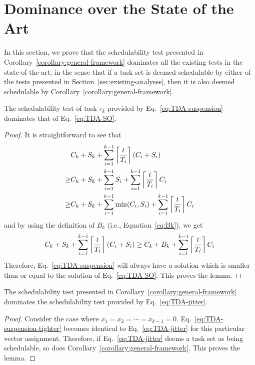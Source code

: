 \section{Dominance over the State of the Art}
\label{sec:dominance}

In this section, we prove that the schedulability test presented in Corollary~\ref{corollary:general-framework} dominates all the existing tests in the state-of-the-art, in the sense that if a task set is deemed schedulable by either of the tests presented in Section~\ref{sec:existing-analyses}, then it is also deemed schedulable by Corollary~\ref{corollary:general-framework}.

\begin{Lemma}
\label{lem:dominance_oblivious}
  The schedulability test of task $\tau_k$ provided by
  Eq.~\eqref{eq:TDA-suspension} dominates that of
  Eq.~\eqref{eq:TDA-SO}.
\end{Lemma}
\begin{proof}
It is straightforward to see that
\begin{align*}
& C_k + S_k + \sum_{i=1}^{k-1}\left\lceil{\frac{t}{T_i}}\right\rceil (C_i + S_i) \\
 \geq & C_k + S_k + \sum_{i=1}^{k-1} S_i + \sum_{i=1}^{k-1}\left\lceil{\frac{t}{T_i}}\right\rceil C_i\\
 \geq & C_k + S_k + \sum_{i=1}^{k-1} \min(C_i, S_i) + \sum_{i=1}^{k-1}\left\lceil{\frac{t}{T_i}}\right\rceil C_i
\end{align*}
and by using the definition of $B_k$ (i.e., Equation~\eqref{eq:Bk}), we get
\begin{align*}
C_k + S_k + \sum_{i=1}^{k-1}\left\lceil{\frac{t}{T_i}}\right\rceil (C_i + S_i) \geq C_k + B_k + \sum_{i=1}^{k-1}\left\lceil{\frac{t}{T_i}}\right\rceil C_i
\end{align*}
Therefore, Eq.~\eqref{eq:TDA-suspension} will always have a solution which is smaller than or equal to the solution of Eq.~\eqref{eq:TDA-SO}. This proves the lemma.
\end{proof}

\begin{Lemma}
  \label{lem:dominance_jitter}
  The schedulability test presented in
  Corollary~\ref{corollary:general-framework} dominates the
  schedulability test provided by Eq.~\eqref{eq:TDA-jitter}.
\end{Lemma}
\begin{proof}
  Consider the case where $x_1=x_2=\cdots=x_{k-1}=0$. Eq.~\eqref{eq:TDA-suspension-tighter} becomes identical to Eq.~\eqref{eq:TDA-jitter} for this particular vector assignment. Therefore, if Eq.~\eqref{eq:TDA-jitter} deems a task set as being schedulable, so does Corollary~\ref{corollary:general-framework}. This proves the lemma. 
\end{proof}
  
